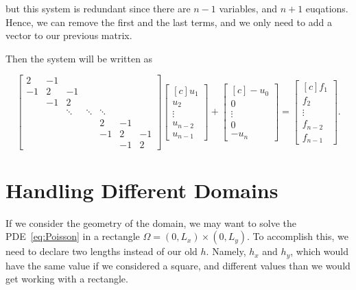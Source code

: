 \documentclass[fontsize=11pt,paper=a4,titlepage]{article}
\begin{document}
but this system is redundant since there are $n - 1$ variables, and $n + 1$
euqations. Hence, we can remove the first and the last terms, and we only need
to add a vector to our previous matrix.

Then the system will be written as

\begin{displaymath}
\begin{bmatrix}
	2 & -1 &  &  &  &  &  \\
	-1 & 2 & -1 &  &  &  &  \\
	 & -1 & 2 &  &  &  &  \\
	 &  & \ddots & \ddots & \ddots &  & \\
	 &  &  &  & 2 & -1 &  \\
	 &  &  &  & -1 & 2 & -1 \\
	 &  &  &  &  & -1 & 2
\end{bmatrix}
\begin{bmatrix*}[c]
	u_1 \\
	u_2 \\
	\vdots \\
	u_{n - 2} \\
	u_{n - 1}
\end{bmatrix*}
+ \begin{bmatrix*}[c]
	- u_0 \\
	0 \\
	\vdots \\
	0 \\
	- u_n
\end{bmatrix*}
=
\begin{bmatrix*}[c]
	f_1 \\
	f_2 \\
	\vdots \\
	f_{n - 2} \\
	f_{n - 1}
\end{bmatrix*}.
\end{displaymath}

\section{Handling Different Domains}

If we consider the geometry of the domain, we may want to solve the
PDE~\ref{eq:Poisson} in a rectangle $\Omega = (0, L_x) \times (0, L_y)$. To
accomplish this, we need to declare two lengths instead of our old $h$. Namely,
$h_x$ and $h_y$, which would have the same value if we considered a square, and
different values than we would get working with a rectangle.
\end{document}
